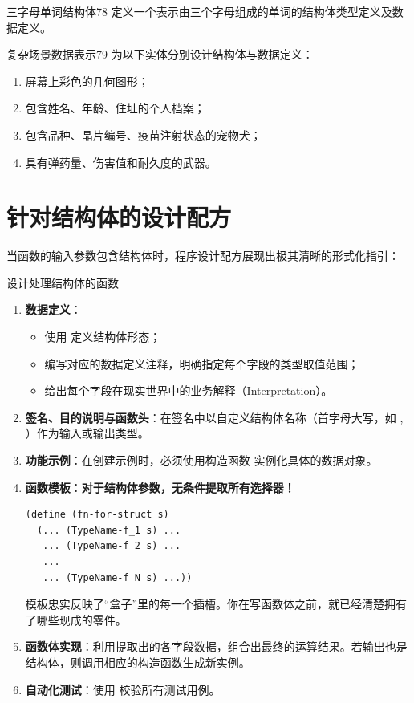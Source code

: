 \begin{exercise}{三字母单词结构体}{78}
定义一个表示由三个字母组成的单词的结构体类型定义及数据定义。
\end{exercise}

\begin{exercise}{复杂场景数据表示}{79}
为以下实体分别设计结构体与数据定义：
\begin{enumerate}
  \item 屏幕上彩色的几何图形；
  \item 包含姓名、年龄、住址的个人档案；
  \item 包含品种、晶片编号、疫苗注射状态的宠物犬；
  \item 具有弹药量、伤害值和耐久度的武器。
\end{enumerate}
\end{exercise}

\section{针对结构体的设计配方}
\label{sec:5.8_designing_with_structures}

当函数的输入参数包含结构体时，程序设计配方展现出极其清晰的形式化指引：

\begin{recipebox}{设计处理结构体的函数}
\begin{enumerate}
  \item \textbf{数据定义}：
    \begin{itemize}
      \item 使用  定义结构体形态；
      \item 编写对应的数据定义注释，明确指定每个字段的类型取值范围；
      \item 给出每个字段在现实世界中的业务解释（Interpretation）。
    \end{itemize}
  \item \textbf{签名、目的说明与函数头}：在签名中以自定义结构体名称（首字母大写，如 , ）作为输入或输出类型。
  \item \textbf{功能示例}：在创建示例时，必须使用构造函数  实例化具体的数据对象。
  \item \textbf{函数模板}：\textbf{对于结构体参数，无条件提取所有选择器！}
\begin{lstlisting}[language=BSL]
(define (fn-for-struct s)
  (... (TypeName-f_1 s) ...
   ... (TypeName-f_2 s) ...
   ...
   ... (TypeName-f_N s) ...))
\end{lstlisting}
    模板忠实反映了“盒子”里的每一个插槽。你在写函数体之前，就已经清楚拥有了哪些现成的零件。
  \item \textbf{函数体实现}：利用提取出的各字段数据，组合出最终的运算结果。若输出也是结构体，则调用相应的构造函数生成新实例。
  \item \textbf{自动化测试}：使用  校验所有测试用例。
\end{enumerate}
\end{recipebox}

